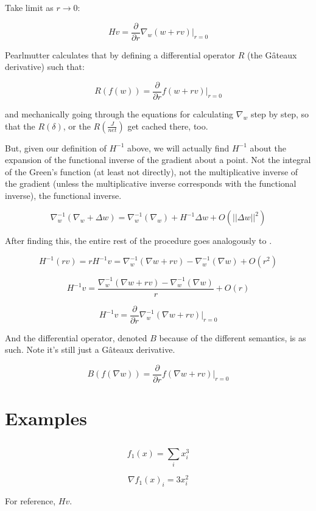 \documentclass{article}
\begin{document}
Take limit as $r \rightarrow 0$:

$$Hv = \frac{\partial}{\partial r} \nabla_w (w + rv) |_{r=0}$$

Pearlmutter calculates that by defining a differential operator $R$ (the G\^{a}teaux derivative\cite{gateaux1913}) such that:

$$R(f(w)) = \frac{\partial}{\partial r} f(w + rv)|_{r=0}$$

and mechanically going through the equations for calculating $\nabla_w$ step by step, so that the $R(\delta)$, or the $R(\frac{J}{net})$ get cached there, too.

But, given our definition of $H^{-1}$ above, we will actually find $H^{-1}$ about the expansion of the functional inverse of the gradient about a point. Not the integral of the Green's function (at least not directly), not the multiplicative inverse of the gradient (unless the multiplicative inverse corresponds with the functional inverse), the functional inverse.

$$\nabla_w^{-1} (\nabla_w + \Delta w) = \nabla_w^{-1} (\nabla_w) + H^{-1} \Delta w + O(||\Delta w||^2)$$

After finding this, the entire rest of the procedure goes analogously to \cite{pearlmutter1994}.

$$H^{-1}(rv) = rH^{-1}v = \nabla_w^{-1}(\nabla w + rv) - \nabla_w^{-1}(\nabla w) + O(r^2)$$

$$H^{-1}v = \frac{\nabla_w^{-1}(\nabla w + rv) - \nabla_w^{-1}(\nabla w)}{r} + O(r)$$

$$H^{-1}v = \frac{\partial}{\partial r} \nabla_w^{-1} (\nabla w + rv) |_{r=0}$$

And the differential operator, denoted $B$ because of the different semantics, is as such. Note it's still just a G\^{a}teaux derivative.

$$B(f(\nabla w)) = \frac{\partial}{\partial r} f(\nabla w + rv)|_{r=0}$$

\section{Examples}

\subsection{}

$$ f_1(x) = \sum_i x_i^3 $$

$$ \nabla f_1(x)_i = 3 x_i^2 $$

For reference, $Hv$.
\end{document}
